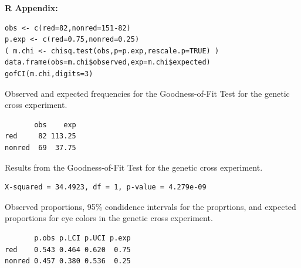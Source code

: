 \documentclass[10pt,openany]{book}\usepackage[]{graphicx}\usepackage[]{color}
\makeatletter
\newenvironment{kframe}{%
 \def\at@end@of@kframe{}%
 \ifinner\ifhmode%
  \def\at@end@of@kframe{\end{minipage}}%
  \begin{minipage}{\columnwidth}%
 \fi\fi%
 \def\FrameCommand##1{\hskip\@totalleftmargin \hskip-\fboxsep
 \colorbox{shadecolor}{##1}\hskip-\fboxsep
     \hskip-\linewidth \hskip-\@totalleftmargin \hskip\columnwidth}%
 \MakeFramed {\advance\hsize-\width
   \@totalleftmargin\z@ \linewidth\hsize
   \@setminipage}}%
 {\par\unskip\endMakeFramed%
 \at@end@of@kframe}
\newenvironment{knitrout}{}{} %
\makeatother
\begin{document}
\begin{minipage}{\textwidth}
\textbf{R Appendix:}
\begin{knitrout}
\color{fgcolor}\begin{kframe}
\begin{verbatim}
obs <- c(red=82,nonred=151-82)
p.exp <- c(red=0.75,nonred=0.25)
( m.chi <- chisq.test(obs,p=p.exp,rescale.p=TRUE) )
data.frame(obs=m.chi$observed,exp=m.chi$expected)
gofCI(m.chi,digits=3)
\end{verbatim}
\end{kframe}
\end{knitrout}
\end{minipage}

\begin{table}[h]
  \caption{Observed and expected frequencies for the Goodness-of-Fit Test for the genetic cross experiment.}
  \label{tab:GOFgenRes}
  \vspace{-12pt}
\begin{knitrout}
\color{fgcolor}\begin{kframe}
\begin{verbatim}
       obs    exp
red     82 113.25
nonred  69  37.75
\end{verbatim}
\end{kframe}
\end{knitrout}
\end{table}

\begin{table}[h]
  \caption{Results from the Goodness-of-Fit Test for the genetic cross experiment.}
  \label{tab:GOFgenChi}
  \vspace{-12pt}
\begin{knitrout}
\color{fgcolor}\begin{kframe}
\begin{verbatim}
X-squared = 34.4923, df = 1, p-value = 4.279e-09
\end{verbatim}
\end{kframe}
\end{knitrout}
\end{table}

\begin{table}[h]
  \caption{Observed proportions, 95\% condidence intervals for the proprtions, and expected proportions for eye colors in the genetic cross experiment.}
  \label{tab:GOFgenCIs}
  \vspace{-12pt}
\begin{knitrout}
\color{fgcolor}\begin{kframe}
\begin{verbatim}
       p.obs p.LCI p.UCI p.exp
red    0.543 0.464 0.620  0.75
nonred 0.457 0.380 0.536  0.25
\end{verbatim}
\end{kframe}
\end{knitrout}
\end{table}



%    
\end{document}
